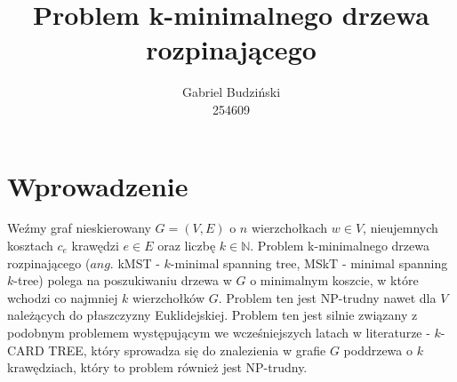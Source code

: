 \documentclass{article}
\title{Problem k-minimalnego drzewa rozpinającego}
\author{Gabriel Budziński\\254609}
\begin{document}
\maketitle

\section{Wprowadzenie}

Weźmy graf nieskierowany $G=(V,E)$ o $n$ wierzchołkach $w \in V$, nieujemnych kosztach $c_e$ krawędzi $e \in E$ oraz liczbę $k \in \mathbb{N}$. Problem k-minimalnego drzewa rozpinającego ($\textit{ang.}$ kMST - $k$-minimal spanning tree, MSkT - minimal spanning $k$-tree) polega na poszukiwaniu drzewa w $G$ o minimalnym koszcie, w które wchodzi co najmniej $k$ wierzchołków $G$. Problem ten jest NP-trudny nawet dla $V$ należących do płaszczyzny Euklidejskiej. Problem ten jest silnie związany z podobnym problemem występującym we wcześniejszych latach w literaturze - $k$-CARD TREE, który sprowadza się do znalezienia w grafie $G$ poddrzewa o $k$ krawędziach, który to problem również jest NP-trudny.
\end{document}
